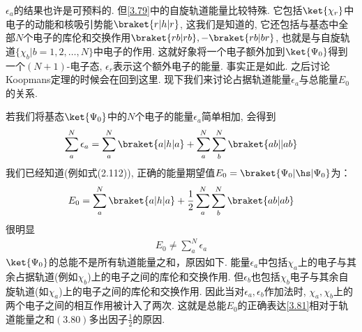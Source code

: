 $\epsilon_a$的结果也许是可预料的. 但\autoref{3.79}中的自旋轨道能量比较特殊. 
它包括$\ket{\chi_r}$中电子的动能和核吸引势能$\braket{r|h|r}$, 这我们是知道的, 
它还包括与\hft 基态中全部$N$个电子的库伦和交换作用$\braket{rb|rb},-\braket{rb|br}$, 也就是与自旋轨道$\{\chi_b|b=1,2,\ldots,N\}$中电子的作用. 
这就好象将一个电子额外加到$\ket{\Psi_0}$得到一个$(N+1)$-电子态, $\epsilon_r$表示这个额外电子的能量. 
事实正是如此. 之后讨论Koopmans定理的时候会在回到这里. 
现下我们来讨论占据轨道能量$\epsilon_a$与总能量$E_0$的关系.

若我们将基态$\ket{\Psi_0}$中的$N$个电子的能量$\epsilon_a$简单相加, 
会得到
\begin{align}
	\sum_{a}^{N}\epsilon_a = \sum_a^N\braket{a|h|a} + \sum_a^N\sum_b^N\braket{ab||ab}
\end{align}
我们已经知道(例如式(2.112)), 
正确的能量期望值$E_0 = \braket{\Psi_0|\hs|\Psi_0}$为：
\begin{align}
	\label{3.81}
	E_0 = \sum_a^N\braket{a|h|a} + \frac{1}{2}\sum_a^N\sum_b^N\braket{ab|ab}
\end{align}
很明显
\begin{align}
	E_0 \neq \sum_a^N \epsilon_a
\end{align}
$\ket{\Psi_0}$的总能不是所有轨道能量之和，原因如下. 
能量$\epsilon_a$中包括$\chi_a$上的电子与其余占据轨道(例如$\chi_b$)上的电子之间的库伦和交换作用. 
但$\epsilon_b$也包括$\chi_b$电子与其余自旋轨道(如$\chi_a$)上的电子之间的库伦和交换作用. 
因此当对$\epsilon_a,\epsilon_b$作加法时, $\chi_a,\chi_b$上的两个电子之间的相互作用被计入了两次. 这就是总能$E_0$的正确表达\autoref{3.81}相对于轨道能量之和$(3.80)$多出因子$\frac{1}{2}$的原因.

